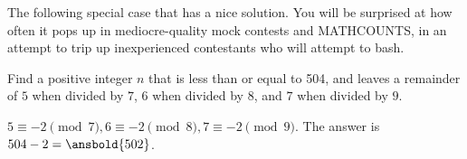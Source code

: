 \documentclass[mast]{lucky}
\begin{document}
The following special case that has a nice solution. You will be surprised at how often it pops up in mediocre-quality mock contests and MATHCOUNTS, in an attempt to trip up inexperienced contestants who will attempt to bash.
\begin{exam}
Find a positive integer $n$ that is less than or equal to 504, and leaves a remainder of $5$ when divided by $7$, $6$ when divided by $8$, and $7$ when divided by $9$.
\end{exam}
\begin{sol}
$5\equiv -2\pmod{7},6\equiv -2\pmod{8},7\equiv -2\pmod{9}$. The answer is $504-2=\ansbold{502}$.
\end{sol}
\end{document}
